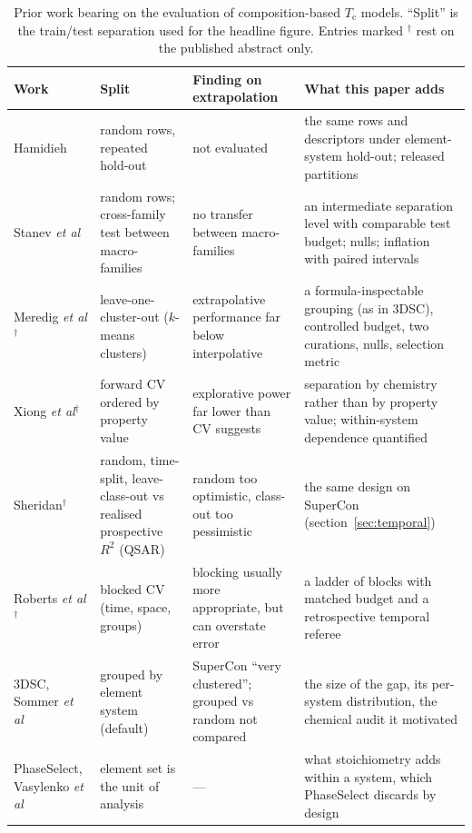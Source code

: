 \documentclass{iopjournal}
\newcommand{\Tc}{T_{\mathrm c}}
\newcommand{\Rsq}{R^{2}}
\newcommand{\etal}{\textit{et al}}
\begin{document}
\begin{table}[t]
\caption{Prior work bearing on the evaluation of composition-based $\Tc$ models. ``Split'' is the
train/test separation used for the headline figure. Entries marked $^{\dagger}$ rest on the
published abstract only.}
\label{tab:prior}
\centering\small\setlength{\tabcolsep}{4pt}
\begin{tabular}{@{}p{2.5cm}p{3.4cm}p{4.0cm}p{4.5cm}@{}}
\toprule
Work & Split & Finding on extrapolation & What this paper adds \\
\midrule
Hamidieh~\cite{hamidieh2018} & random rows, repeated hold-out & not evaluated & the same rows and descriptors under element-system hold-out; released partitions \\
Stanev \etal~\cite{stanev2018} & random rows; cross-family test between macro-families & no transfer between macro-families & an intermediate separation level with comparable test budget; nulls; inflation with paired intervals \\
Meredig \etal$^{\dagger}$~\cite{meredig2018} & leave-one-cluster-out ($k$-means clusters) & extrapolative performance far below interpolative & a formula-inspectable grouping (as in 3DSC), controlled budget, two curations, nulls, selection metric \\
Xiong \etal$^{\dagger}$~\cite{xiong2020} & forward CV ordered by property value & explorative power far lower than CV suggests & separation by chemistry rather than by property value; within-system dependence quantified \\
Sheridan$^{\dagger}$~\cite{sheridan2013} & random, time-split, leave-class-out vs realised prospective $\Rsq$ (QSAR) & random too optimistic, class-out too pessimistic & the same design on SuperCon (section~\ref{sec:temporal}) \\
Roberts \etal$^{\dagger}$~\cite{roberts2017} & blocked CV (time, space, groups) & blocking usually more appropriate, but can overstate error & a ladder of blocks with matched budget and a retrospective temporal referee \\
3DSC, Sommer \etal~\cite{sommer2023} & grouped by element system (default) & SuperCon ``very clustered''; grouped vs random not compared & the size of the gap, its per-system distribution, the chemical audit it motivated \\
PhaseSelect, Vasylenko \etal~\cite{vasylenko2023} & element set is the unit of analysis & --- & what stoichiometry adds within a system, which PhaseSelect discards by design \\
\bottomrule
\end{tabular}
\end{table}
\end{document}
